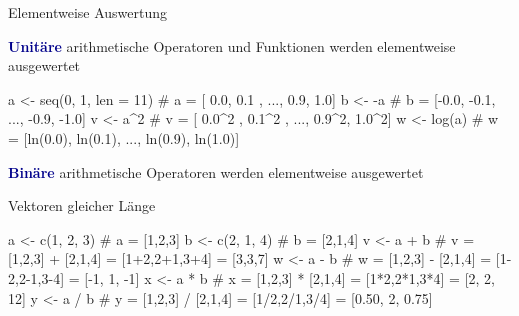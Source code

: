 \documentclass[
  8pt,
  ignorenonframetext,
]{beamer}
\newenvironment{Shaded}{\begin{snugshade}}{\end{snugshade}}
\newcommand{\AttributeTok}[1]{\textcolor[rgb]{0.40,0.45,0.13}{#1}}
\newcommand{\CommentTok}[1]{\textcolor[rgb]{0.37,0.37,0.37}{#1}}
\newcommand{\DecValTok}[1]{\textcolor[rgb]{0.68,0.00,0.00}{#1}}
\newcommand{\FunctionTok}[1]{\textcolor[rgb]{0.28,0.35,0.67}{#1}}
\newcommand{\NormalTok}[1]{\textcolor[rgb]{0.00,0.23,0.31}{#1}}
\newcommand{\OtherTok}[1]{\textcolor[rgb]{0.00,0.23,0.31}{#1}}
\newcommand{\SpecialCharTok}[1]{\textcolor[rgb]{0.37,0.37,0.37}{#1}}
\begin{document}
\begin{frame}[fragile]{Elementweise Auswertung}
\protect\hypertarget{elementweise-auswertung}{}
\small

\textbf{\textcolor{darkblue}{Unitäre}} arithmetische Operatoren und
Funktionen werden elementweise ausgewertet

\footnotesize

\begin{Shaded}
\begin{Highlighting}[]
\NormalTok{a }\OtherTok{\textless{}{-}} \FunctionTok{seq}\NormalTok{(}\DecValTok{0}\NormalTok{, }\DecValTok{1}\NormalTok{, }\AttributeTok{len =} \DecValTok{11}\NormalTok{) }\CommentTok{\# a = [ 0.0, 0.1 , ..., 0.9, 1.0]}
\NormalTok{b }\OtherTok{\textless{}{-}} \SpecialCharTok{{-}}\NormalTok{a                  }\CommentTok{\# b = [{-}0.0, {-}0.1, ..., {-}0.9, {-}1.0]}
\NormalTok{v }\OtherTok{\textless{}{-}}\NormalTok{ a}\SpecialCharTok{\^{}}\DecValTok{2}                 \CommentTok{\# v = [ 0.0\^{}2 ,  0.1\^{}2 , ..., 0.9\^{}2, 1.0\^{}2]}
\NormalTok{w }\OtherTok{\textless{}{-}} \FunctionTok{log}\NormalTok{(a)              }\CommentTok{\# w = [ln(0.0), ln(0.1), ..., ln(0.9), ln(1.0)]}
\end{Highlighting}
\end{Shaded}

\small

\textbf{\textcolor{darkblue}{Binäre}} arithmetische Operatoren werden
elementweise ausgewertet

\footnotesize

Vektoren gleicher Länge

\begin{Shaded}
\begin{Highlighting}[]
\NormalTok{a }\OtherTok{\textless{}{-}} \FunctionTok{c}\NormalTok{(}\DecValTok{1}\NormalTok{, }\DecValTok{2}\NormalTok{, }\DecValTok{3}\NormalTok{)          }\CommentTok{\# a = [1,2,3]}
\NormalTok{b }\OtherTok{\textless{}{-}} \FunctionTok{c}\NormalTok{(}\DecValTok{2}\NormalTok{, }\DecValTok{1}\NormalTok{, }\DecValTok{4}\NormalTok{)          }\CommentTok{\# b = [2,1,4]}
\NormalTok{v }\OtherTok{\textless{}{-}}\NormalTok{ a }\SpecialCharTok{+}\NormalTok{ b               }\CommentTok{\# v = [1,2,3] + [2,1,4] = [1+2,2+1,3+4] = [3,3,7]}
\NormalTok{w }\OtherTok{\textless{}{-}}\NormalTok{ a }\SpecialCharTok{{-}}\NormalTok{ b               }\CommentTok{\# w = [1,2,3] {-} [2,1,4] = [1{-}2,2{-}1,3{-}4] = [{-}1, 1, {-}1]}
\NormalTok{x }\OtherTok{\textless{}{-}}\NormalTok{ a }\SpecialCharTok{*}\NormalTok{ b               }\CommentTok{\# x = [1,2,3] * [2,1,4] = [1*2,2*1,3*4] = [2, 2, 12]}
\NormalTok{y }\OtherTok{\textless{}{-}}\NormalTok{ a }\SpecialCharTok{/}\NormalTok{ b               }\CommentTok{\# y = [1,2,3] / [2,1,4] = [1/2,2/1,3/4] = [0.50, 2, 0.75]}
\end{Highlighting}
\end{Shaded}


\end{frame}
\end{document}
